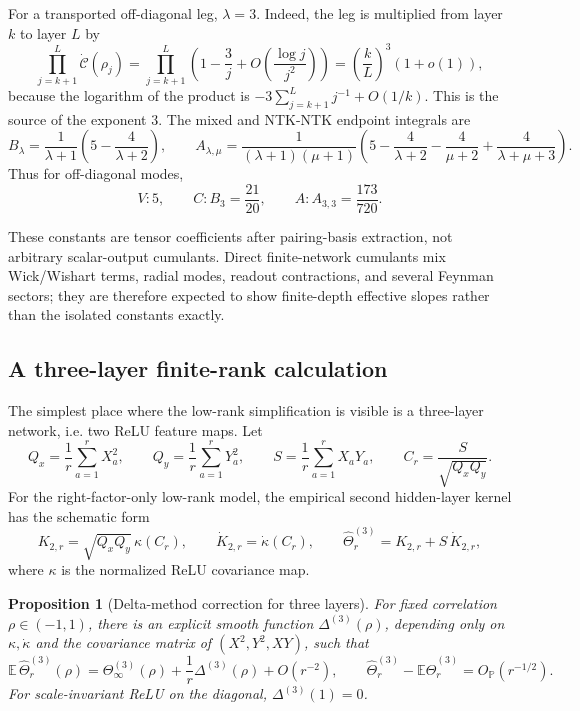 \documentclass{article}
\newtheorem{proposition}[theorem]{Proposition}
\newcommand{\E}{\mathbb E}
\newcommand{\Pp}{\mathbb P}
\newcommand{\wh}{\widehat}
\begin{document}
For a transported off-diagonal leg, \(\lambda=3\). Indeed, the leg is multiplied from layer \(k\) to layer \(L\) by
\[
\prod_{j=k+1}^{L}\dot{\mathcal C}(\rho_j)
=\prod_{j=k+1}^{L}\left(1-\frac3j+O\left(\frac{\log j}{j^2}\right)\right)
=\left(\frac{k}{L}\right)^3(1+o(1)),
\]
because the logarithm of the product is \(-3\sum_{j=k+1}^{L}j^{-1}+O(1/k)\). This is the source of the exponent \(3\). The mixed and NTK-NTK endpoint integrals are
\begin{equation}
B_\lambda=\frac1{\lambda+1}\left(5-\frac4{\lambda+2}\right),
\qquad
A_{\lambda,\mu}=\frac{1}{(\lambda+1)(\mu+1)}\left(5-\frac4{\lambda+2}-\frac4{\mu+2}+\frac4{\lambda+\mu+3}\right).
\end{equation}
Thus for off-diagonal modes,
\begin{equation}
V: 5,
\qquad
C: B_3=\frac{21}{20},
\qquad
A: A_{3,3}=\frac{173}{720}.
\label{eq:endpoint-constants}
\end{equation}

These constants are tensor coefficients after pairing-basis extraction, not arbitrary scalar-output cumulants. Direct finite-network cumulants mix Wick/Wishart terms, radial modes, readout contractions, and several Feynman sectors; they are therefore expected to show finite-depth effective slopes rather than the isolated constants exactly.

\subsection{A three-layer finite-rank calculation}
The simplest place where the low-rank simplification is visible is a three-layer network, i.e. two ReLU feature maps. Let
\[
Q_x=\frac1r\sum_{a=1}^{r}X_a^2,\qquad
Q_y=\frac1r\sum_{a=1}^{r}Y_a^2,\qquad
S=\frac1r\sum_{a=1}^{r}X_aY_a,
\qquad
C_r=\frac{S}{\sqrt{Q_xQ_y}}.
\]
For the right-factor-only low-rank model, the empirical second hidden-layer kernel has the schematic form
\[
K_{2,r}=\sqrt{Q_xQ_y}\,\kappa(C_r),
\qquad
\dot K_{2,r}=\dot\kappa(C_r),
\qquad
\wh\Theta^{(3)}_r=K_{2,r}+S\,\dot K_{2,r},
\]
where \(\kappa\) is the normalized ReLU covariance map.

\begin{proposition}[Delta-method correction for three layers]
\label{prop:three-layer-delta}
For fixed correlation \(\rho\in(-1,1)\), there is an explicit smooth function \(\Delta^{(3)}(\rho)\), depending only on \(\kappa,\dot\kappa\) and the covariance matrix of \((X^2,Y^2,XY)\), such that
\begin{equation}
\E\,\wh\Theta^{(3)}_r(\rho)
=\Theta^{(3)}_\infty(\rho)+\frac1r\Delta^{(3)}(\rho)+O(r^{-2}),
\qquad
\wh\Theta^{(3)}_r-\E\wh\Theta^{(3)}_r=O_{\Pp}(r^{-1/2}).
\label{eq:three-layer-delta}
\end{equation}
For scale-invariant ReLU on the diagonal, \(\Delta^{(3)}(1)=0\).
\end{proposition}
\end{document}
